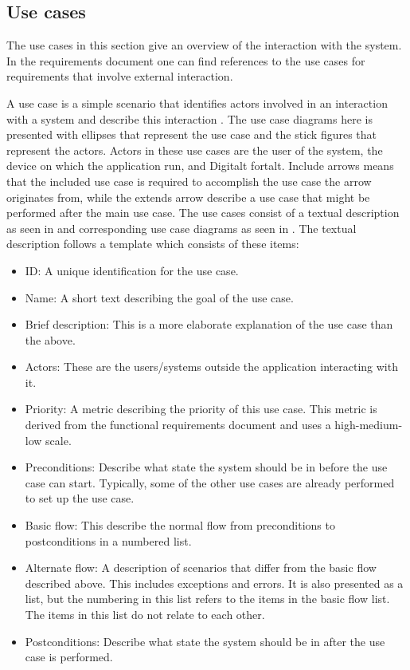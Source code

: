 \subsection{Use cases}
\label{subsec:use_cases}

The use cases in this section give an overview of the interaction with the system. In the requirements document one can find references to the use cases for requirements that involve external interaction.\newline

A use case is a simple scenario that identifies actors involved in an interaction with a system and describe this interaction \cite[p.106-107]{Sommerville}. The use case diagrams here is presented with ellipses that represent the use case and the stick figures that represent the actors. Actors in these use cases are the user of the system, the device on which the application run, and Digitalt fortalt. Include arrows means that the included use case is required to accomplish the use case the arrow originates from, while the extends arrow describe a use case that might be performed after the main use case. The use cases consist of a textual description as seen in \textbf{} and corresponding use case diagrams as seen in \textbf{}. The textual description follows a template which consists of these items:
\begin{itemize}
\item ID: A unique identification for the use case.
\item Name: A short text describing the goal of the use case.
\item Brief description: This is a more elaborate explanation of the use case than the above.
\item Actors: These are the users/systems outside the application interacting with it.
\item Priority: A metric describing the priority of this use case. This metric is derived from the functional requirements document and uses a high-medium-low scale.
\item Preconditions: Describe what state the system should be in before the use case can start. Typically, some of the other use cases are already performed to set up the use case.
\item Basic flow: This describe the normal flow from preconditions to postconditions in a numbered list.
\item Alternate flow: A description of scenarios that differ from the basic flow described above. This includes exceptions and errors. It is also presented as a list, but the numbering in this list refers to the items in the basic flow list. The items in this list do not relate to each other.
\item Postconditions: Describe what state the system should be in after the use case is performed.
\end{itemize}
